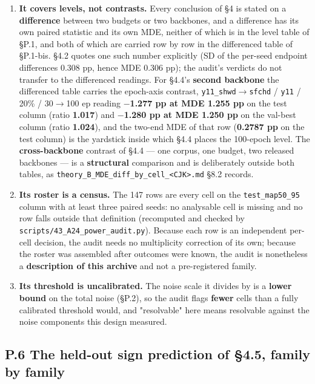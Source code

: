 \documentclass[pdflatex,sn-mathphys-ay]{sn-jnl}
\begin{document}
\begin{enumerate}
\item \textbf{It covers levels, not contrasts.} Every conclusion of \S{}4 is stated on a \textbf{difference} between two budgets or two backbones, and a difference has its own paired statistic and its own MDE, neither of which is in the level table of \S{}P.1, and both of which are carried row by row in the differenced table of \S{}P.1-bis. \S{}4.2 quotes one such number explicitly (SD of the per-seed endpoint differences 0.308 pp, hence MDE 0.306 pp); the audit's verdicts do not transfer to the differenced readings. For \S{}4.4's \textbf{second backbone} the differenced table carries the epoch-axis contrast, \texttt{y11\_shwd\ensuremath{\rightarrow}sfchd} / \texttt{y11} / 20\% / 30\ensuremath{\rightarrow}100 ep reading \textbf{\ensuremath{-}1.277 pp at MDE 1.255 pp} on the test column (ratio \textbf{1.017}) and \textbf{\ensuremath{-}1.280 pp at MDE 1.250 pp} on the val-best column (ratio \textbf{1.024}), and the two-end MDE of that row (\textbf{0.2787 pp} on the test column) is the yardstick inside which \S{}4.4 places the 100-epoch level. The \textbf{cross-backbone} contrast of \S{}4.4 --- one corpus, one budget, two released backbones --- is a \textbf{structural} comparison and is deliberately outside both tables, as \texttt{theory\_B\_MDE\_diff\_by\_cell\_<CJK>.md} \S{}8.2 records.
\item \textbf{Its roster is a census.} The 147 rows are every cell on the \texttt{test\_map50\_95} column with at least three paired seeds: no analysable cell is missing and no row falls outside that definition (recomputed and checked by \texttt{scripts/43\_A24\_power\_audit.py}). Because each row is an independent per-cell decision, the audit needs no multiplicity correction of its own; because the roster was assembled after outcomes were known, the audit is nonetheless a \textbf{description of this archive} and not a pre-registered family.
\item \textbf{Its threshold is uncalibrated.} The noise scale it divides by is a \textbf{lower bound} on the total noise (\S{}P.2), so the audit flags \textbf{fewer} cells than a fully calibrated threshold would, and "resolvable" here means resolvable against the noise components this design measured.
\end{enumerate}

\subsection*{P.6 The held-out sign prediction of \S{}4.5, family by family}
\end{document}
